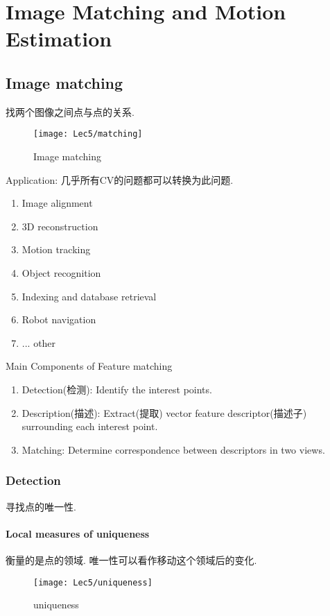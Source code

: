 \chapter{Image Matching and Motion Estimation}
\section{Image matching}
找两个图像之间点与点的关系. 
\begin{figure}[H]
    \centering
    \texttt{[image: Lec5/matching]}
    \caption{Image matching}
\end{figure}

Application: 几乎所有CV的问题都可以转换为此问题. 
\begin{enumerate}
    \item Image alignment
    \item 3D reconstruction
    \item Motion tracking
    \item Object recognition
    \item Indexing and database retrieval
    \item Robot navigation
    \item ... other
\end{enumerate}

Main Components of Feature matching
\begin{enumerate}
    \item Detection(检测): Identify the interest points.
    \item Description(描述): Extract(提取) vector feature descriptor(描述子) surrounding each interest point.
    \item Matching: Determine correspondence between descriptors in two views. 
\end{enumerate}

\subsection{Detection}
寻找点的唯一性.
\subsubsection{Local measures of uniqueness}
    衡量的是点的领域. 唯一性可以看作移动这个领域后的变化.
    \begin{figure}[H]
        \centering
        \texttt{[image: Lec5/uniqueness]}
        \caption{uniqueness}
    \end{figure}

